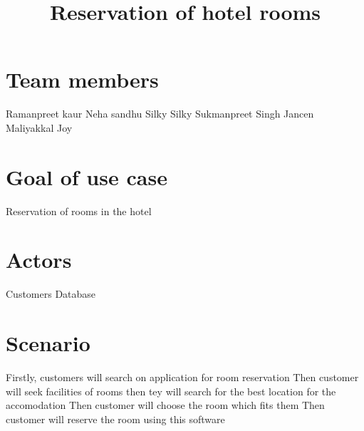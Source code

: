 \documentclass[10pt]{article}
\title{ Reservation of hotel rooms}
\begin{document}
\maketitle
\tableofcontents

\section{Team members}
Ramanpreet kaur
\newline Neha sandhu
\newline Silky Silky
\newline Sukmanpreet Singh
\newline Jancen Maliyakkal Joy

\section{Goal of use case}
Reservation of rooms in the hotel
\newline 
\break 
\section{Actors}
Customers
\newline Database


\section{Scenario}

Firstly, customers will search on application for room reservation
\newline Then customer will seek facilities of rooms then tey will search for the best location for the accomodation
\newline Then customer will choose the room which fits them
\newline Then customer will reserve the room using this software
\end{document}
